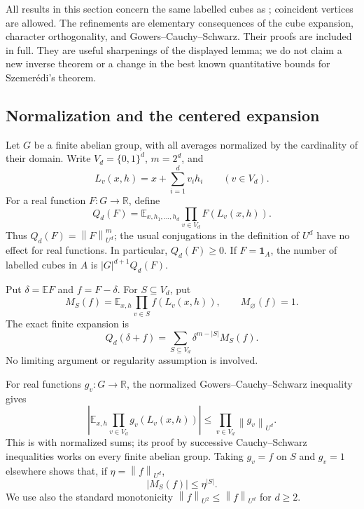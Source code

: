 \documentclass[11pt,letterpaper]{article}
\numberwithin{equation}{section}
\theoremstyle{definition}
\theoremstyle{remark}
\newcommand{\E}{\mathbb E}
\newcommand{\R}{\mathbb R}
\newcommand{\1}{\mathbf 1}
\newcommand{\norm}[1]{\left\|#1\right\|}
\begin{document}
All results in this section concern the same labelled cubes as
\cite[Lemmas~3.7--3.10]{gowers}; coincident vertices are allowed.
The refinements are elementary consequences of the cube expansion,
character orthogonality, and Gowers--Cauchy--Schwarz.  Their proofs are
included in full.  They are useful sharpenings of the displayed lemma;
we do not claim a new inverse theorem or a change in the best known
quantitative bounds for Szemer\'edi's theorem.

\subsection{Normalization and the centered expansion}

Let $G$ be a finite abelian group, with all averages normalized by the
cardinality of their domain.  Write $V_d=\{0,1\}^d$, $m=2^d$, and
\[
 L_v(x,h)=x+\sum_{i=1}^d v_i h_i
 \qquad(v\in V_d).
\]
For a real function $F:G\to\R$, define
\begin{equation}
 Q_d(F)=\E_{x,h_1,\ldots,h_d}
                \prod_{v\in V_d}F(L_v(x,h)).
 \label{gsr:cc:03:cube:qdef}
\end{equation}
Thus $Q_d(F)=\norm{F}_{U^d}^{m}$; the usual conjugations in the
definition of $U^d$ have no effect for real functions.  In particular,
$Q_d(F)\geq0$.  If $F=\1_A$, the number of labelled cubes in $A$ is
$|G|^{d+1}Q_d(F)$.

Put $\delta=\E F$ and $f=F-\delta$.  For $S\subseteq V_d$, put
\begin{equation}
 M_S(f)=\E_{x,h}\prod_{v\in S}f(L_v(x,h)),
 \qquad M_\varnothing(f)=1.
 \label{gsr:cc:03:cube:ms}
\end{equation}
The exact finite expansion is
\begin{equation}
 Q_d(\delta+f)=
 \sum_{S\subseteq V_d}\delta^{m-|S|}M_S(f).
 \label{gsr:cc:03:cube:expansion}
\end{equation}
No limiting argument or regularity assumption is involved.

For real functions $g_v:G\to\R$, the normalized
Gowers--Cauchy--Schwarz inequality gives
\begin{equation}
 \left|\E_{x,h}\prod_{v\in V_d}g_v(L_v(x,h))\right|
 \leq\prod_{v\in V_d}\norm{g_v}_{U^d}.
 \label{gsr:cc:03:cube:gcs}
\end{equation}
This is \cite[Lemma~3.8]{gowers} with normalized sums; its proof by
successive Cauchy--Schwarz inequalities works on every finite abelian
group.  Taking $g_v=f$ on $S$ and $g_v=1$ elsewhere shows that, if
$\eta=\norm{f}_{U^d}$,
\begin{equation}
 |M_S(f)|\leq\eta^{|S|}.
 \label{gsr:cc:03:cube:holder}
\end{equation}
We use also the standard monotonicity
$\norm{f}_{U^2}\leq\norm{f}_{U^d}$ for $d\geq2$.
\end{document}
